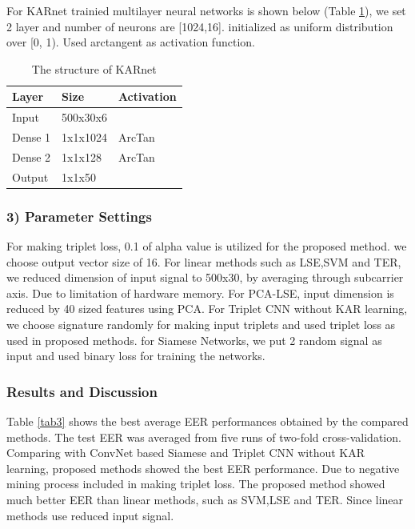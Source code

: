 \documentclass[runningheads]{llncs}
\begin{document}
For KARnet trainied multilayer neural networks is shown below (Table \ref{tab2}), we set 2 layer and number of neurons are [1024,16]. initialized as uniform distribution over [0, 1).
Used arctangent as activation function.

\begin{table}[]
    \caption{The structure of KARnet}\label{tab2}
    \centering
    \begin{tabular}{|l|l|l|}
    \hline
    Layer   & Size     & Activation \\ \hline
    Input   & 500x30x6 &            \\
    Dense 1 & 1x1x1024 & ArcTan     \\
    Dense 2 & 1x1x128  & ArcTan     \\
    Output  & 1x1x50   &            \\ \hline
    \end{tabular}
\end{table}

\subsubsection{3) Parameter Settings}
For making triplet loss, 0.1 of alpha value is utilized for the proposed method.
we choose output vector size of 16.
For linear methods such as LSE,SVM and TER, we reduced dimension of input signal to 500x30, by averaging through subcarrier axis. Due to limitation of hardware memory.
For PCA-LSE, input dimension is reduced by 40 sized features using PCA.
For Triplet CNN without KAR learning, we choose signature randomly for making input triplets and used triplet loss as used in proposed methods.
for Siamese Networks, we put 2 random signal as input and used binary loss for training the networks.

\subsubsection{Results and Discussion}

Table \ref{tab3} shows the best average EER performances obtained by the compared methods. The test EER was averaged from five runs of two-fold cross-validation.
Comparing with ConvNet based Siamese and Triplet CNN without KAR learning, proposed methods showed the best EER performance. Due to negative mining process included in making triplet loss.
The proposed method showed much better EER than linear methods, such as SVM,LSE and TER. Since linear methods use reduced input signal.
\end{document}
